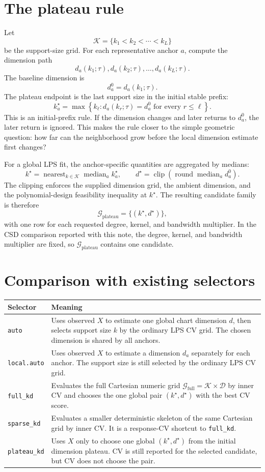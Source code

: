 \documentclass[11pt]{article}
\newcommand{\Gfull}{\mathcal G_{\mathrm{full}}}
\newcommand{\Gplateau}{\mathcal G_{\mathrm{plateau}}}
\newcommand{\code}[1]{\texttt{#1}}
\begin{document}
\section{The plateau rule}

Let
\[
  \mathcal K=\{k_1<k_2<\cdots<k_L\}
\]
be the support-size grid.  For each representative anchor \(a\), compute the
dimension path
\[
  d_a(k_1;\tau),d_a(k_2;\tau),\ldots,d_a(k_L;\tau).
\]
The baseline dimension is
\[
  d_a^0=d_a(k_1;\tau).
\]
The plateau endpoint is the last support size in the initial stable prefix:
\[
  k_a^\star
  =
  \max\left\{
  k_\ell:
  d_a(k_r;\tau)=d_a^0
  \text{ for every } r\le \ell
  \right\}.
\]
This is an initial-prefix rule.  If the dimension changes and later returns to
\(d_a^0\), the later return is ignored.  This makes the rule closer to the
simple geometric question: how far can the neighborhood grow before the local
dimension estimate first changes?

For a global LPS fit, the anchor-specific quantities are aggregated by medians:
\[
  k^\star
  =
  \operatorname{nearest}_{k\in\mathcal K}
  \operatorname{median}_a k_a^\star,
  \qquad
  d^\star
  =
  \operatorname{clip}
  \left(
  \operatorname{round}\operatorname{median}_a d_a^0
  \right).
\]
The clipping enforces the supplied dimension grid, the ambient dimension, and
the polynomial-design feasibility inequality at \(k^\star\).  The resulting
candidate family is therefore
\[
  \Gplateau=\{(k^\star,d^\star)\},
\]
with one row for each requested degree, kernel, and bandwidth multiplier.  In
the CSD comparison reported with this note, the degree, kernel, and bandwidth
multiplier are fixed, so \(\Gplateau\) contains one candidate.

\section{Comparison with existing selectors}

\begin{tabularx}{\textwidth}{@{}lX@{}}
\toprule
Selector & Meaning \\
\midrule
\code{auto} &
Uses observed \(X\) to estimate one global chart dimension \(d\), then selects
support size \(k\) by the ordinary LPS CV grid.  The chosen dimension is shared
by all anchors. \\
\code{local.auto} &
Uses observed \(X\) to estimate a dimension \(d_a\) separately for each anchor.
The support size is still selected by the ordinary LPS CV grid. \\
\code{full\_kd} &
Evaluates the full Cartesian numeric grid
\(\Gfull=\mathcal K\times\mathcal D\) by inner CV and chooses the one global
pair \((k^\star,d^\star)\) with the best CV score. \\
\code{sparse\_kd} &
Evaluates a smaller deterministic skeleton of the same Cartesian grid by inner
CV.  It is a response-CV shortcut to \code{full\_kd}. \\
\code{plateau\_kd} &
Uses \(X\) only to choose one global \((k^\star,d^\star)\) from the initial
dimension plateau.  CV is still reported for the selected candidate, but CV
does not choose the pair. \\
\bottomrule
\end{tabularx}
\end{document}
